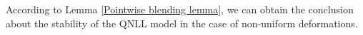 
	

According to Lemma \ref{Pointwise blending lemma}, we can obtain the conclusion about the stability of the QNLL model in the case of non-uniform deformations.


